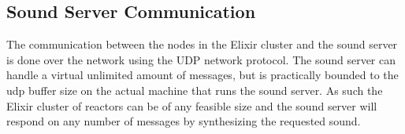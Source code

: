 \documentclass[a4paper]{book}
\begin{document}
%
\subsection{Sound Server Communication}
The communication between the nodes in the Elixir cluster and the sound server is done over the network using the UDP network protocol. The sound server can handle a virtual unlimited amount of messages, but is practically bounded to the udp buffer size on the actual machine that runs the sound server. As such the Elixir cluster of reactors can be of any feasible size and the sound server will respond on any number of messages by synthesizing the requested sound. 
\end{document}
